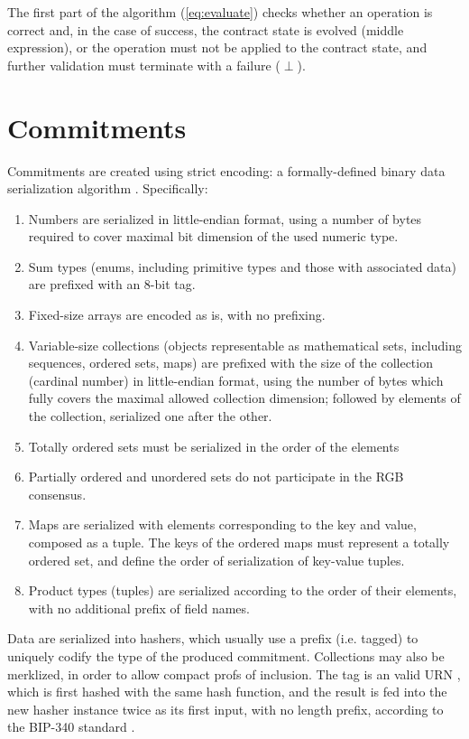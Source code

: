 \documentclass[9pt,oneside]{amsart}
\begin{document}
\begin{multicols}{2}
The first part of the algorithm (\ref{eq:evaluate}) checks whether an operation is correct and,
in the case of success, the contract state is evolved (middle expression),
or the operation must not be applied to the contract state,
and further validation must terminate with a failure ($\perp$).

\section{Commitments}\label{Commitments}

Commitments are created using strict encoding:
a formally-defined binary data serialization algorithm \cite{strict}.
Specifically:
\begin{enumerate}
\item Numbers are serialized in little-endian format,
   using a number of bytes required to cover maximal bit dimension of the used numeric type.
\item Sum types (enums, including primitive types and those with associated data)
   are prefixed with an 8-bit tag.
\item Fixed-size arrays are encoded as is, with no prefixing.
\item Variable-size collections (objects representable as mathematical sets,
   including sequences, ordered sets, maps)
   are prefixed with the size of the collection (cardinal number) in little-endian format,
   using the number of bytes which fully covers the maximal allowed collection dimension;
   followed by elements of the collection, serialized one after the other.
\item Totally ordered sets must be serialized in the order of the elements
\item Partially ordered and unordered sets do not participate in the RGB consensus.
\item Maps are serialized with elements corresponding to the key and value, composed as a tuple.
   The keys of the ordered maps must represent a totally ordered set,
   and define the order of serialization of key-value tuples.
\item Product types (tuples) are serialized according to the order of their elements,
   with no additional prefix of field names.
\end{enumerate}

Data are serialized into hashers, which usually use a prefix (i.e. tagged)
to uniquely codify the type of the produced commitment.
Collections may also be merklized, in order to allow compact profs of inclusion.
The tag is an valid URN \cite{URN}, which is first hashed with the same hash function,
and the result is fed into the new hasher instance twice as its first input,
with no length prefix, according to the BIP-340 standard \cite{BIP341}.


\end{multicols}
\end{document}
